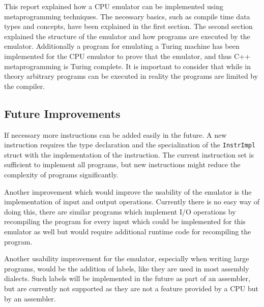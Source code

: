 
This report explained how a CPU emulator can be implemented using metaprogramming techniques.
The necessary basics, such as compile time data types and concepts, have been explained 
in the first section. The second section explained the structure of the emulator and how
programs are executed by the emulator. Additionally a program for emulating a Turing
machine has been implemented for the CPU emulator to prove that the emulator, and thus
C++ metaprogramming is Turing complete. It is important to consider that while in theory
arbitrary programs can be executed in reality the programs are limited by the compiler.

\subsection{Future Improvements}
If necessary more instructions can be added easily in the future. A new instruction
requires the type declaration and the specialization of the \lstinline{InstrImpl}
struct with the implementation of the instruction. The current instruction set
is sufficient to implement all programs, but new instructions might reduce the
complexity of programs significantly.

Another improvement which would improve the usability of the emulator is the implementation
of input and output operations. Currently there is no easy way of doing this, there are
similar programs which implement I/O operations by recompiling the program for
every input \cite{iohack1} \cite{iohack2} which could be implemented for this
emulator as well but would require additional runtime code for recompiling the program.

Another usability improvement for the emulator, especially when writing large programs,
would be the addition of labels, like they are used in most assembly dialects.
Such labels will be implemented in the future as part of an assembler, but are
currently not supported as they are not a feature provided by a CPU but by an assembler.
